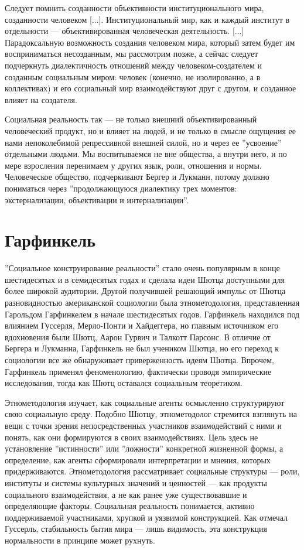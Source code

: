 \documentclass[11pt]{book}
\begin{document}
\smallskip
{}\relax
{}\relax

Следует помнить созданности объективности институционального мира, созданности человеком [...]. Институциональный мир, как и каждый институт в отдельности --- объективированная человеческая деятельность. [...] Парадоксальную возможность создания человеком мира, который затем будет им восприниматься несозданным, мы рассмотрим позже, а сейчас следует подчеркнуть диалектичность отношений между человеком-создателем и созданным социальным миром: человек (конечно, не изолированно, а в коллективах) и его социальный мир взаимодействуют друг с другом, и созданное влияет на создателя.

\relax
{}\relax
\smallskip

Социальная реальность так --- не только внешний объективированный человеческий продукт, но и влияет на людей, и не только в смысле ощущения ее нами непоколебимой репрессивной внешней силой, но и через ее ''усвоение'' отдельными людьми. Мы воспитываемся не вне общества, а внутри него, и по мере взросления перенимаем у других язык, роли, отношения и нормы. Человеческое общество, подчеркивают Бергер и Лукманн, потому должно пониматься через ''продолжающуюся диалектику трех моментов: экстернализации, объективации и интернализации''.

\section{Гарфинкель}

''Социальное конструирование реальности'' стало очень популярным в конце шестидесятых и в семидесятых годах и сделала идеи Шютца доступными для более широкой аудитории. Другой получившей решающий импульс от Шютца разновидностью американской социологии была этнометодология, представленная Гарольдом Гарфинкелем в начале шестидесятых годов. Гарфинкель находился под влиянием Гуссерля, Мерло-Понти и Хайдеггера, но главным источником его вдохновения были Шютц, Аарон Гурвич и Талкотт Парсонс. В отличие от Бергера и Лукманна, Гарфинкель не был учеником Шютца, но его переход к социологии все же обнаруживает приверженность идеям Шютца. Впрочем, Гарфинкель применял феноменологию, фактически проводя эмпирические исследования, тогда как Шютц оставался социальным теоретиком.

Этнометодология изучает, как социальные агенты осмысленно структурируют свою социальную среду. Подобно Шютцу, этнометодолог стремится взглянуть на вещи с точки зрения непосредственных участников взаимодействий с ними и понять, как они формируются в своих взаимодействиях. Цель здесь не установление ''истинности'' или ''ложности'' конкретной жизненной формы, а определение, как агенты сформировали интерпретации и мнения, которых придерживаются. Этнометодология рассматривает социальные структуры --- роли, институты и системы культурных значений и ценностей --- как продукты социального взаимодействия, а не как ранее уже существовавшие и определяющие факторы. Социальная реальность понимается, активно поддерживаемой участниками, хрупкой и уязвимой конструкцией. Как отмечал Гуссерль, стабильность бытия мира --- лишь видимость, эта конструкция нормальности в принципе может рухнуть.
\end{document}
